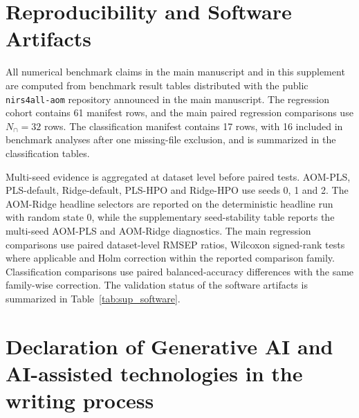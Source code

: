 \documentclass[11pt,a4paper]{article}
\newcommand{\code}[1]{\nolinkurl{#1}}
\begin{document}
\begin{table}[h]
\centering
\caption{AOM-Ridge headline seed audit on the 18-dataset overlap between
$N_{\cap}=32$ and the archived
\code{da001\_audit20\_seeds012}/\code{da001\_partial\_fast12\_seeds012}
workspaces.  ``Max RMSEP span across seeds'' is the per-dataset maximum
$\max_s\text{RMSEP}(s)-\min_s\text{RMSEP}(s)$, aggregated as the row maximum.
Both selectors record identical RMSEP at seeds 0, 1 and 2 on every dataset.}
\label{tab:sup_ridge_seed_audit}
\small

\end{table}

\section{Reproducibility and Software Artifacts}

\begin{table}[h]
\centering
\caption{Software artifacts distributed with the AOM study.}
\label{tab:sup_software}
\small

\end{table}

All numerical benchmark claims in the main manuscript and in this supplement
are computed from benchmark result tables distributed with the public
\code{nirs4all-aom} repository announced in the main manuscript.  The regression
cohort contains 61 manifest rows, and the main paired regression comparisons
use $N_{\cap}=32$ rows.  The classification manifest contains 17 rows, with 16
included in benchmark analyses after one missing-file exclusion, and is
summarized in the classification tables.

Multi-seed evidence is aggregated at dataset level before paired tests.
AOM-PLS, PLS-default, Ridge-default, PLS-HPO and Ridge-HPO use seeds 0, 1 and
2.  The AOM-Ridge headline selectors are reported on the deterministic
headline run with random state 0, while the supplementary seed-stability
table reports the multi-seed AOM-PLS and AOM-Ridge diagnostics.  The main
regression comparisons use paired dataset-level RMSEP ratios, Wilcoxon
signed-rank tests where applicable and Holm correction within the reported
comparison family.
Classification comparisons use paired balanced-accuracy differences with the
same family-wise correction.  The validation status of the software artifacts
is summarized in Table~\ref{tab:sup_software}.

\section{Declaration of Generative AI and AI-assisted technologies in the writing process}
\end{document}
